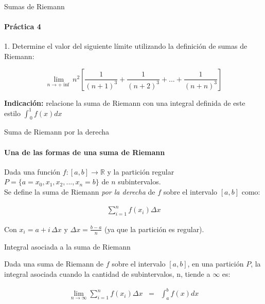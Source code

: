 \documentclass{plantillaPPT}
\begin{document}
\primeraDiapo

\begin{frame}{Sumas de Riemann}
    \framesubtitle{Práctica 4}
\vspace{0.1cm}
1. Determine el valor del siguiente límite utilizando la definición de sumas de Riemann:

\[\lim_{n\to +\inf} n^2\left[ \frac{1}{(n+1)^3} + \frac{1}{(n+2)^3} + ... + \frac{1}{(n+n)^3}\right]\]\vspace{0.3cm}

\textbf{Indicación:} relacione la suma de Riemann con una integral definida de este estilo \(\int_{\, 0}^1f(x)dx\)
\end{frame}

\begin{frame}{Suma de Riemann por la derecha}
    \framesubtitle{Una de las formas de una suma de Riemann}

    \begin{definicion}
        Dada una función \(f: [a,b] \to \mathbb{R} \) y la partición regular \(P=\{a=x_0, x_1, x_2, ... , x_n=b\}\) de \(n\) subintervalos. \\ Se define la suma de Riemann \textit{por la derecha} de \(f\) sobre el intervalo \([a,b]\) como:

        \begin{align*}
            \sum_{i=1}^n f(x_i)\Delta x
        \end{align*}\vspace{0.5cm}

        Con \(x_i=a+i\, \Delta x\) y \(\Delta x= \frac{b-a}{n}\) (ya que la partición es regular).
        
    \end{definicion}
    
\end{frame}

\begin{frame}{Integral asociada a la suma de Riemann}

    \begin{definicion}
        Dada una suma de Riemann de \(f\) sobre el intervalo \([a,b]\), en una partición \(P\), la integral asociada cuando la cantidad de subintervalos, n, tiende a \(\infty\) es:

        \begin{align*}
            \lim_{n \to \infty} \sum_{i=1}^n f(x_i)\Delta x \; \; = \; \; \int_{a}^bf(x)dx
        \end{align*}
        
    \end{definicion}
    
\end{frame}
\end{document}
